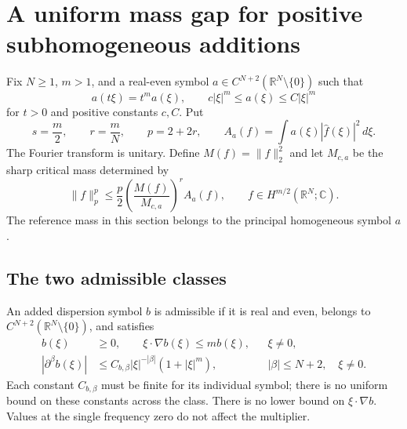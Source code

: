\section{A uniform mass gap for positive subhomogeneous additions}
\label{sec:cone}

Fix \(N\ge1\), \(m>1\), and a real-even symbol
\(a\in C^{N+2}(\mathbb R^N\setminus\{0\})\) such that
\begin{equation}\label{cone:principal}
a(t\xi)=t^m a(\xi),\qquad
c|\xi|^m\le a(\xi)\le C|\xi|^m
\end{equation}
for \(t>0\) and positive constants \(c,C\). Put
\[
s=\frac m2,\qquad r=\frac mN,\qquad p=2+2r,
\qquad A_a(f)=\int a(\xi)|\widehat f(\xi)|^2\,d\xi.
\]
The Fourier transform is unitary. Define \(M(f)=\|f\|_2^2\) and let
\(M_{c,a}\) be the sharp critical mass determined by
\begin{equation}\label{cone:gn}
\|f\|_p^p\le\frac p2
\left(\frac{M(f)}{M_{c,a}}\right)^r A_a(f),
\qquad f\in H^{m/2}(\mathbb R^N;\mathbb C).
\end{equation}
The reference mass in this section belongs to the principal
homogeneous symbol \(a\).

\subsection{The two admissible classes}

An added dispersion symbol \(b\) is admissible if it is real and even,
belongs to \(C^{N+2}(\mathbb R^N\setminus\{0\})\), and satisfies
\begin{align}
b(\xi)&\ge0,\qquad \xi\cdot\nabla b(\xi)\le m b(\xi),
&&\xi\ne0,\label{cone:dispersion-sign}\\
|\partial^\beta b(\xi)|
&\le C_{b,\beta}|\xi|^{-|\beta|}(1+|\xi|^m),
&&|\beta|\le N+2,\quad \xi\ne0.\label{cone:dispersion-regularity}
\end{align}
Each constant \(C_{b,\beta}\) must be finite for its individual symbol;
there is no uniform bound on these constants across the class.
There is no lower bound on \(\xi\cdot\nabla b\). Values at the single
frequency zero do not affect the multiplier.

